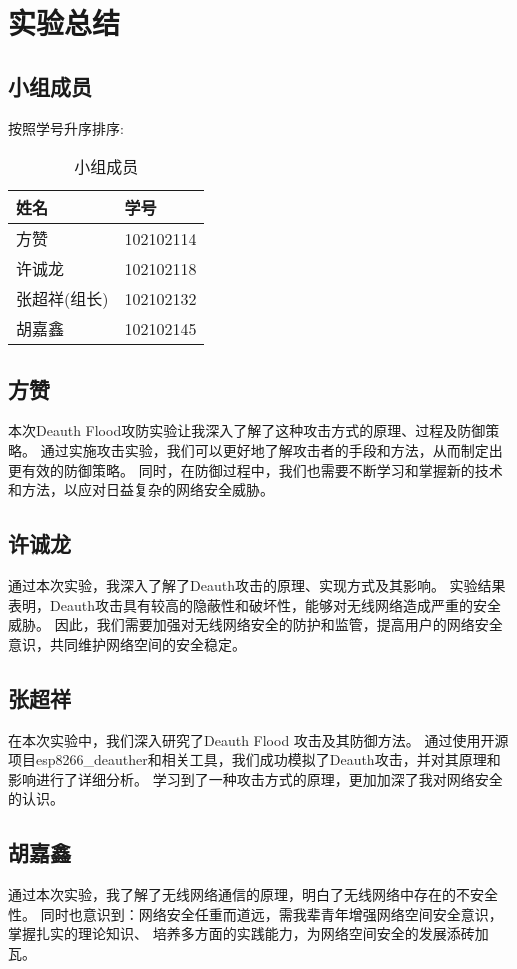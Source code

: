 \documentclass[../main.tex]{subfiles}
\begin{document}
\section{实验总结}
\subsection{小组成员}
按照学号升序排序:
\begin{table}[H]
  \caption{小组成员}
  \begin{center}
    \begin{tabular}[c]{ll}
      \hline
      姓名 & 学号 \\
      \hline
      方赞 & 102102114 \\
      许诚龙 & 102102118 \\
      张超祥(组长) & 102102132 \\
      胡嘉鑫 & 102102145 \\
      \hline
    \end{tabular}
  \end{center}
\end{table}
%
\subsection{方赞}
本次Deauth Flood攻防实验让我深入了解了这种攻击方式的原理、过程及防御策略。
通过实施攻击实验，我们可以更好地了解攻击者的手段和方法，从而制定出更有效的防御策略。
同时，在防御过程中，我们也需要不断学习和掌握新的技术和方法，以应对日益复杂的网络安全威胁。
%
\subsection{许诚龙}
通过本次实验，我深入了解了Deauth攻击的原理、实现方式及其影响。
实验结果表明，Deauth攻击具有较高的隐蔽性和破坏性，能够对无线网络造成严重的安全威胁。
因此，我们需要加强对无线网络安全的防护和监管，提高用户的网络安全意识，共同维护网络空间的安全稳定。
%
\subsection{张超祥}
在本次实验中，我们深入研究了Deauth Flood 攻击及其防御方法。
通过使用开源项目esp8266\_deauther和相关工具，我们成功模拟了Deauth攻击，并对其原理和影响进行了详细分析。
学习到了一种攻击方式的原理，更加加深了我对网络安全的认识。
%
\subsection{胡嘉鑫}
通过本次实验，我了解了无线网络通信的原理，明白了无线网络中存在的不安全性。
同时也意识到：网络安全任重而道远，需我辈青年增强网络空间安全意识，掌握扎实的理论知识、
培养多方面的实践能力，为网络空间安全的发展添砖加瓦。
%
\end{document}
